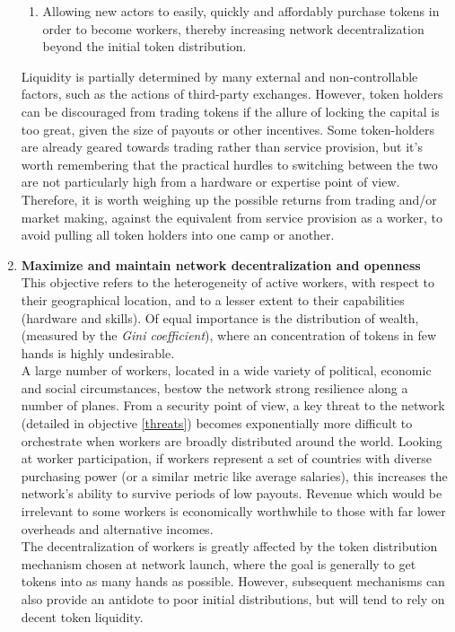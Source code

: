 \documentclass[11pt]{amsart}
\begin{document}
\begin{enumerate}
\begin{enumerate}
   \item Allowing new actors to easily, quickly and affordably purchase tokens in order to become workers, thereby increasing network decentralization beyond the initial token distribution. 
   \end{enumerate}
   Liquidity is partially determined by many external and non-controllable factors, such as the actions of third-party exchanges. However, token holders can be discouraged from trading tokens if the allure of locking the capital is too great, given the size of payouts or other incentives. Some token-holders are already geared towards trading rather than service provision, but it's worth remembering that the practical hurdles to switching between the two are not particularly high from a hardware or expertise point of view. Therefore, it is worth weighing up the possible returns from trading and/or market making, against the equivalent from service provision as a worker, to avoid pulling all token holders into one camp or another. 
   \\
   \item \textbf{Maximize and maintain network decentralization and openness}\label{decent}
   \\
   This objective refers to the heterogeneity of active workers, with respect to their geographical location, and to a lesser extent to their capabilities (hardware and skills). Of equal importance is the distribution of wealth, (measured by the \textit{Gini coefficient}), where an concentration of tokens in few hands is highly undesirable.
   \\
   A large number of workers, located in a wide variety of political, economic and social circumstances, bestow the network strong resilience along a number of planes. From a security point of view, a key threat to the network (detailed in objective \ref{threats}) becomes exponentially more difficult to orchestrate when workers are broadly distributed around the world. Looking at worker participation, if workers represent a set of countries with diverse purchasing power (or a similar metric like average salaries), this increases the network's ability to survive periods of low payouts. Revenue which would be irrelevant to some workers is economically worthwhile to those with far lower overheads and alternative incomes. 
   \\
   The decentralization of workers is greatly affected by the token distribution mechanism chosen at network launch, where the goal is generally to get tokens into as many hands as possible. However, subsequent mechanisms can also provide an antidote to poor initial distributions, but will tend to rely on decent token liquidity.  

\end{enumerate}
\end{document}
